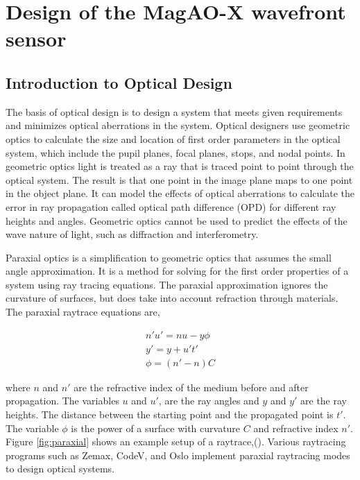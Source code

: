 \chapter{Design of the MagAO-X wavefront sensor}

\section{Introduction to Optical Design}

The basis of optical design is to design a system that meets given requirements and minimizes optical aberrations in the system. Optical designers use geometric optics to calculate the size and location of first order parameters in the optical system, which include the pupil planes, focal planes, stops, and nodal points. In geometric optics light is treated as a ray that is traced point to point through the optical system. The result is that one point in the image plane maps to one point in the object plane. It can model the effects of optical aberrations to calculate the error in ray propagation called optical path difference (OPD) for different ray heights and angles. Geometric optics cannot be used to predict the effects of the wave nature of light, such as diffraction and interferometry. 

Paraxial optics is a simplification to geometric optics that assumes the small angle approximation. It is a method for solving for the first order properties of a system using ray tracing equations. The paraxial approximation ignores the curvature of surfaces, but does take into account refraction through materials. The paraxial raytrace equations are,

\begin{eqnarray}
       n'u'=nu -y\phi  \label{4PWFSslopes} \\
       y'=y+u't' \nonumber \\
       \phi =(n'-n)C
\end{eqnarray}

where $n$ and $n'$ are the refractive index of the medium before and after propagation. The variables $u$ and $u'$, are the ray angles and $y$ and $y'$ are the ray heights. The distance between the starting point and the propagated point is $t'$. The variable $\phi$ is the power of a surface with curvature $C$ and refractive index $n'$. Figure \ref{fig:paraxial} shows an example setup of a raytrace,(\cite{greivenkamp2004field}). Various raytracing programs such as Zemax, CodeV, and Oslo implement paraxial raytracing modes to design optical systems. 


